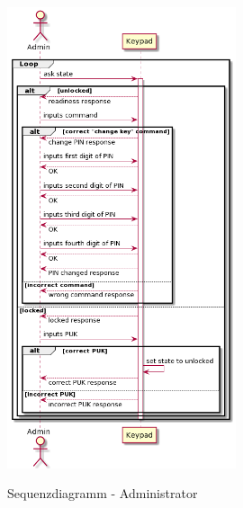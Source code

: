 \begin{figure}[H]
    \caption{Sequenzdiagramm - Administrator}
    \centering
    \includegraphics[width=0.6\textwidth]{images/sequence-admin.png}
    \label{fig:sequence-admin}
\end{figure}